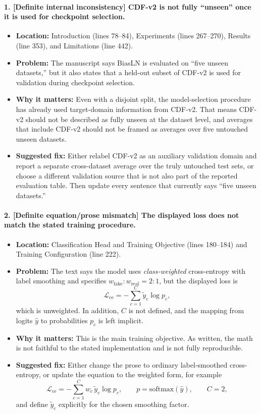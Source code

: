 \documentclass[11pt]{article}
\begin{document}
\paragraph{1. [Definite internal inconsistency] CDF-v2 is not fully ``unseen'' once it is used for checkpoint selection.}
\begin{itemize}
    \item \textbf{Location:} Introduction (lines 78--84), Experiments (lines 267--270), Results (line 353), and Limitations (line 442).
    \item \textbf{Problem:} The manuscript says BiasLN is evaluated on ``five unseen datasets,'' but it also states that a held-out subset of CDF-v2 is used for validation during checkpoint selection.
    \item \textbf{Why it matters:} Even with a disjoint split, the model-selection procedure has already used target-domain information from CDF-v2. That means CDF-v2 should not be described as fully unseen at the dataset level, and averages that include CDF-v2 should not be framed as averages over five untouched unseen datasets.
    \item \textbf{Suggested fix:} Either relabel CDF-v2 as an auxiliary validation domain and report a separate cross-dataset average over the truly untouched test sets, or choose a different validation source that is not also part of the reported evaluation table. Then update every sentence that currently says ``five unseen datasets.''
\end{itemize}

\paragraph{2. [Definite equation/prose mismatch] The displayed loss does not match the stated training procedure.}
\begin{itemize}
    \item \textbf{Location:} Classification Head and Training Objective (lines 180--184) and Training Configuration (line 222).
    \item \textbf{Problem:} The text says the model uses \emph{class-weighted} cross-entropy with label smoothing and specifies $w_{\mathrm{fake}}:w_{\mathrm{real}} = 2:1$, but the displayed loss is
    \[
    \mathcal{L}_{\text{ce}} = - \sum_{c=1}^{C} \tilde{y}_c \log p_c,
    \]
    which is unweighted. In addition, $C$ is not defined, and the mapping from logits $\hat{y}$ to probabilities $p_c$ is left implicit.
    \item \textbf{Why it matters:} This is the main training objective. As written, the math is not faithful to the stated implementation and is not fully reproducible.
    \item \textbf{Suggested fix:} Either change the prose to ordinary label-smoothed cross-entropy, or update the equation to the weighted form, for example
    \[
    \mathcal{L}_{\text{ce}} = - \sum_{c=1}^{C} w_c\, \tilde{y}_c \log p_c,
    \qquad p = \mathrm{softmax}(\hat{y}),
    \qquad C = 2,
    \]
    and define $\tilde{y}_c$ explicitly for the chosen smoothing factor.
\end{itemize}
\end{document}

